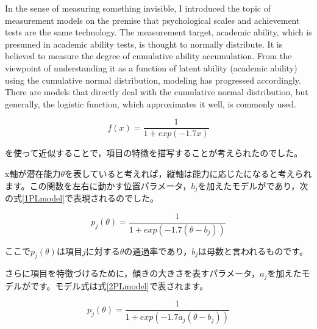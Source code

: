 \documentclass{ltjsbook}
\begin{document}
In the sense of measuring something invisible, I introduced the topic of measurement models on the premise that psychological scales and achievement tests are the same technology.
The measurement target, academic ability, which is presumed in academic ability tests, is thought to normally distribute. It is believed to measure the degree of cumulative ability accumulation. From the viewpoint of understanding it as a function of latent ability (academic ability) using the cumulative normal distribution, modeling has progressed accordingly. There are models that directly deal with the cumulative normal distribution, but generally, the logistic function, which approximates it well, is commonly used.

\[ f(x) = \frac{1}{1+exp(-1.7x)}\]

を使って近似することで，項目の特徴を描写することが考えられたのでした。

x軸が潜在能力$\theta$を表していると考えれば，縦軸は能力に応じたになると考えられます。この関数を左右に動かす位置パラメータ，$b_j$を加えたモデルがであり，次の式\ref{1PLmodel}で表現されるのでした。

\begin{equation}
	p_j(\theta) = \frac{1}{1+exp(-1.7(\theta-b_j))}
	\label{1PLmodel}
\end{equation}

ここで$p_j(\theta)$は項目$j$に対する$\theta$の通過率であり，$b_j$は母数と言われるものです。

さらに項目を特徴づけるために，傾きの大きさを表すパラメータ，$a_j$を加えたモデルがです。モデル式は式\ref{2PLmodel}で表されます。

\begin{equation}
	p_j(\theta) = \frac{1}{1+exp(-1.7a_j(\theta-b_j))}
	\label{2PLmodel}
\end{equation}
\end{document}
